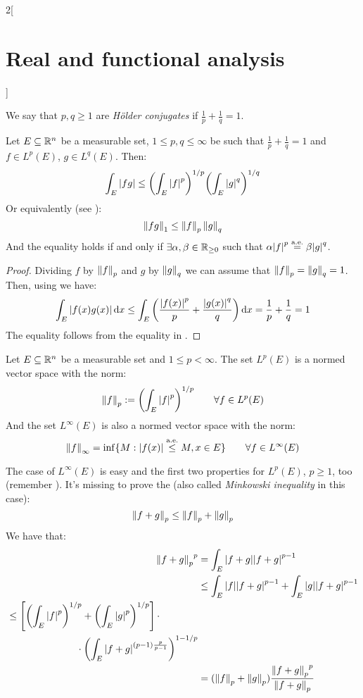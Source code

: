 \documentclass[../../../main_math.tex]{subfiles}
\begin{document}
\begin{multicols}{2}[\section{Real and functional analysis}]
  \begin{definition}
    We say that $p,q\geq 1$ are \emph{Hölder conjugates} if $\frac{1}{p}+\frac{1}{q}=1$.
  \end{definition}
  \begin{proposition}\label{RFA:holder}
    Let $E\subseteq\mathbb{R}^n$ be a measurable set, $1\leq p,q\leq \infty$ be such that $\frac{1}{p}+\frac{1}{q}=1$ and ${f}\in L^p(E)$, ${g}\in L^q(E)$. Then:
    $$\int_E\abs{fg}\leq {\left(\int_E\abs{f}^p\right)}^{1/p}{\left(\int_E\abs{g}^q\right)}^{1/q}$$
    Or equivalently (see ):
    $$\left\|{fg}\right\|_1\leq\left\|{f}\right\|_p\left\|{g}\right\|_q$$
    And the equality holds if and only if $\exists \alpha,\beta\in\mathbb{R}_{\geq 0}$ such that $\alpha{\abs{{f}}}^p\overset{\text{a.e.}}{=}\beta{\abs{{g}}}^q$.
  \end{proposition}
  \begin{proof}
    Dividing $f$ by $\left\|f\right\|_p$ and $g$ by $\left\|g\right\|_q$ we can assume that $\left\|f\right\|_p=\left\|g\right\|_q=1$. Then, using  we have:
    $$\int_E\abs{f(x)g(x)}\dd{x}\leq\int_E\left(\frac{\abs{f(x)}^p}{p}+\frac{\abs{g(x)}^q}{q}\right)\dd{x}=\frac{1}{p}+\frac{1}{q}=1$$
    The equality follows from the equality in .
  \end{proof}
  \begin{proposition}\label{RFA:lpnorm}
    Let $E\subseteq\mathbb{R}^n$ be a measurable set and $1\leq p<\infty$. The set $L^p(E)$ is a normed vector space with the norm: $$\left\|{f}\right\|_p:={\left(\int_E\abs{{f}}^p\right)}^{1/p}\qquad\forall{f}\in L^p(E)$$
    And the set $L^\infty(E)$ is also a normed vector space with the norm: $$\left\|{f}\right\|_\infty=\inf \{M:\abs{{f}(x)}\overset{\text{a.e.}}{\leq} M, x\in E\}\qquad\forall{f}\in L^\infty(E)$$
  \end{proposition}
  \begin{sproof}
    The case of $L^\infty(E)$ is easy and the first two properties for $L^p(E)$, $p\geq 1$, too (remember ). It's missing to prove the  (also called \emph{Minkowski inequality} in this case): $$\left\|f+g\right\|_p\leq \left\|f\right\|_p+\left\|g\right\|_p$$
    We have that:
    \begin{align*}
      {\left\|f+g\right\|_p}^p & =\int_E\abs{f+g}\abs{f+g}^{p-1}                                            \\
                       & \leq \int_E\abs{f}\abs{f+g}^{p-1}+\int_E\abs{g}\abs{f+g}^{p-1}             \\
      \begin{split}
        & \leq \left[{\left(\int_E\abs{f}^p\right)}^{1/p}+{\left(\int_E\abs{g}^p\right)}^{1/p}\right]\cdot \\
        &\hspace{2.5cm}\cdot{\left(\int_E\abs{f+g}^{(p-1)\frac{p}{p-1}}\right)}^{1-1/p}
      \end{split} \\
                       & =(\left\|f\right\|_p+\left\|g\right\|_p)\frac{{\left\|f+g\right\|_p}^p }{{\left\|f+g\right\|_p}}
    \end{align*}
  \end{sproof}

\end{multicols}
\end{document}
